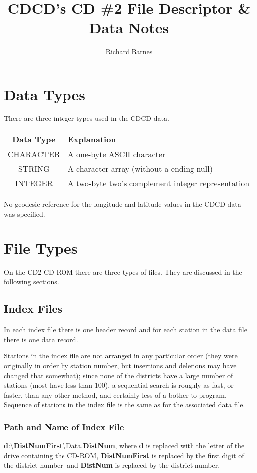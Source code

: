 \documentclass[12pt]{article}
\title{CDCD's CD \#2 File Descriptor \& Data Notes}
\author{Richard Barnes}
\begin{document}
\maketitle

\tableofcontents

\section{Data Types}
There are three integer types used in the CDCD data.
\begin{center}
\begin{tabular}{c | l}
Data Type & Explanation \\
\hline
CHARACTER & A one-byte ASCII character \\
STRING & A character array (without a ending null) \\
INTEGER & A two-byte two's complement integer representation
\end{tabular}
\end{center}

No geodesic reference for the longitude and latitude values in the CDCD data was specified.

\section{File Types}
On the CD2 CD-ROM there are three types of files. They are discussed in the following sections.

\subsection{Index Files}
In each index file there is one header record and for each station in the data file there is one data record.

Stations in the index file are not arranged in any particular order (they were originally in order by station number, but insertions and deletions may have changed that somewhat); since none of the districts have a large number of stations (most have less than 100), a sequential search is roughly as fast, or faster, than any other method, and certainly less of a bother to program.  Sequence of stations in the index file is the same as for the associated data file.

\subsubsection{Path and Name of Index File}
\textbf{d}:\textbackslash{}\textbf{DistNumFirst}\textbackslash{}Data.\textbf{DistNum}, where \textbf{d} is replaced with the letter of the drive containing the CD-ROM, \textbf{DistNumFirst} is replaced by the first digit of the district number, and \textbf{DistNum} is replaced by the district number.
\end{document}
